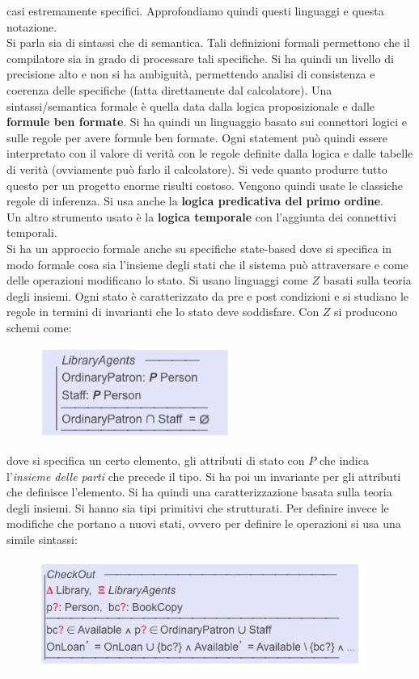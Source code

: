 \documentclass[a4paper,12pt, oneside]{book}
\begin{document}
casi estremamente specifici. Approfondiamo quindi questi linguaggi e questa
notazione. \\
Si parla sia di sintassi che di semantica. Tali definizioni formali permettono
che il compilatore sia in grado di processare tali specifiche. Si ha quindi un
livello di precisione alto e non si ha ambiguità, permettendo analisi di
consistenza e coerenza delle specifiche (fatta direttamente dal
calcolatore). Una sintassi/semantica formale è quella data dalla logica
proposizionale e dalle \textbf{formule ben formate}. Si ha quindi un linguaggio
basato sui connettori logici e sulle regole per avere formule ben formate. Ogni
statement può quindi essere interpretato con il valore di verità con le regole
definite dalla logica e dalle tabelle di verità (ovviamente può farlo il
calcolatore). Si vede quanto produrre tutto questo per un progetto enorme
risulti costoso. Vengono quindi usate le classiche regole di inferenza. Si usa
anche la \textbf{logica predicativa del primo ordine}.\\
Un altro strumento usato è la \textbf{logica temporale} con l'aggiunta dei
connettivi temporali.\\
Si ha un approccio formale anche su specifiche state-based dove si specifica in
modo formale cosa sia l'insieme degli stati che il sistema può attraversare e
come delle operazioni modificano lo stato. Si usano linguaggi come $Z$ basati
sulla teoria degli insiemi. Ogni stato è caratterizzato da pre e post condizioni
e si studiano le regole in termini di invarianti che lo stato deve
soddisfare. Con $Z$ si producono schemi come:
\begin{figure}[H]
  \centering
  \includegraphics[scale = 0.6]{img/z.jpg}
\end{figure}
dove si specifica un certo elemento, gli attributi di stato con $P$ che indica
l'\textit{insieme delle parti} che precede il tipo. Si ha poi un invariante per
gli attributi che definisce l'elemento. Si ha quindi una caratterizzazione
basata sulla teoria degli insiemi. Si hanno sia tipi primitivi che
strutturati. Per definire invece le modifiche che portano a nuovi stati, ovvero
per definire le operazioni si usa una simile sintassi:
\begin{figure}[H]
  \centering
  \includegraphics[scale = 0.6]{img/z2.jpg}
\end{figure}
\end{document}
